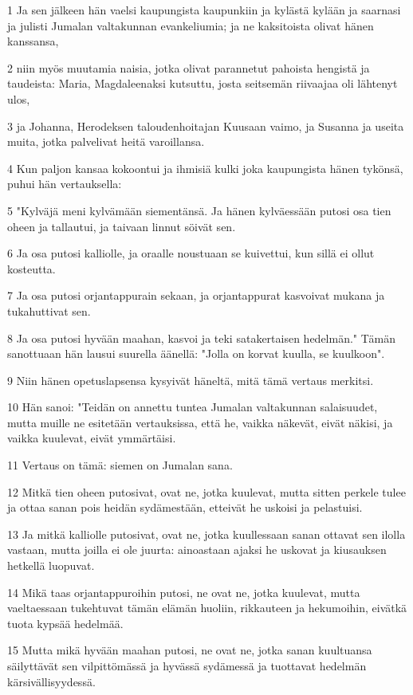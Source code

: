 \par 1 Ja sen jälkeen hän vaelsi kaupungista kaupunkiin ja kylästä kylään ja saarnasi ja julisti Jumalan valtakunnan evankeliumia; ja ne kaksitoista olivat hänen kanssansa,
\par 2 niin myös muutamia naisia, jotka olivat parannetut pahoista hengistä ja taudeista: Maria, Magdaleenaksi kutsuttu, josta seitsemän riivaajaa oli lähtenyt ulos,
\par 3 ja Johanna, Herodeksen taloudenhoitajan Kuusaan vaimo, ja Susanna ja useita muita, jotka palvelivat heitä varoillansa.
\par 4 Kun paljon kansaa kokoontui ja ihmisiä kulki joka kaupungista hänen tykönsä, puhui hän vertauksella:
\par 5 "Kylväjä meni kylvämään siementänsä. Ja hänen kylväessään putosi osa tien oheen ja tallautui, ja taivaan linnut söivät sen.
\par 6 Ja osa putosi kalliolle, ja oraalle noustuaan se kuivettui, kun sillä ei ollut kosteutta.
\par 7 Ja osa putosi orjantappurain sekaan, ja orjantappurat kasvoivat mukana ja tukahuttivat sen.
\par 8 Ja osa putosi hyvään maahan, kasvoi ja teki satakertaisen hedelmän." Tämän sanottuaan hän lausui suurella äänellä: "Jolla on korvat kuulla, se kuulkoon".
\par 9 Niin hänen opetuslapsensa kysyivät häneltä, mitä tämä vertaus merkitsi.
\par 10 Hän sanoi: "Teidän on annettu tuntea Jumalan valtakunnan salaisuudet, mutta muille ne esitetään vertauksissa, että he, vaikka näkevät, eivät näkisi, ja vaikka kuulevat, eivät ymmärtäisi.
\par 11 Vertaus on tämä: siemen on Jumalan sana.
\par 12 Mitkä tien oheen putosivat, ovat ne, jotka kuulevat, mutta sitten perkele tulee ja ottaa sanan pois heidän sydämestään, etteivät he uskoisi ja pelastuisi.
\par 13 Ja mitkä kalliolle putosivat, ovat ne, jotka kuullessaan sanan ottavat sen ilolla vastaan, mutta joilla ei ole juurta: ainoastaan ajaksi he uskovat ja kiusauksen hetkellä luopuvat.
\par 14 Mikä taas orjantappuroihin putosi, ne ovat ne, jotka kuulevat, mutta vaeltaessaan tukehtuvat tämän elämän huoliin, rikkauteen ja hekumoihin, eivätkä tuota kypsää hedelmää.
\par 15 Mutta mikä hyvään maahan putosi, ne ovat ne, jotka sanan kuultuansa säilyttävät sen vilpittömässä ja hyvässä sydämessä ja tuottavat hedelmän kärsivällisyydessä.
